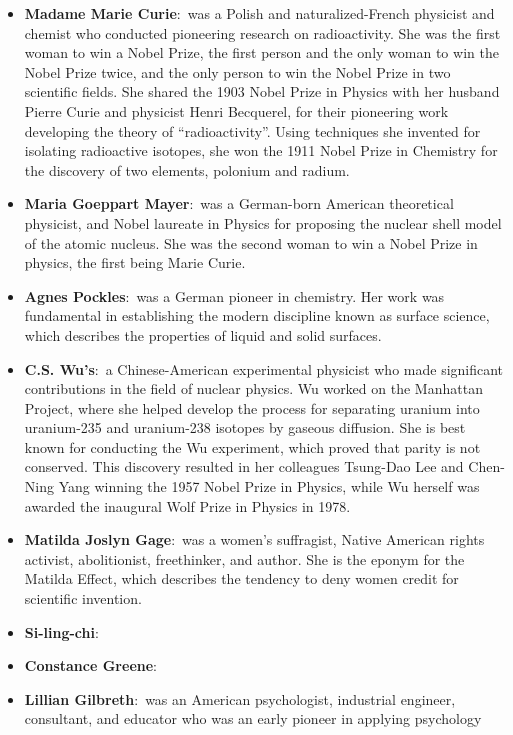 \documentclass[11pt,a4paper]{article}
\begin{document}
  \clearpage
  \begin{itemize}
    \item \textbf{Madame Marie Curie}:\ was a Polish and naturalized-French physicist and chemist who conducted pioneering research on radioactivity. 
    She was the first woman to win a Nobel Prize, the first person and the only woman to win the Nobel Prize twice, and the only person to win the Nobel 
    Prize in two scientific fields. She shared the 1903 Nobel Prize in Physics with her husband Pierre Curie and physicist Henri Becquerel, for their 
    pioneering work developing the theory of ``radioactivity''. Using techniques she invented for isolating radioactive isotopes, she won the 1911 Nobel 
    Prize in Chemistry for the discovery of two elements, polonium and radium.
    \item \textbf{Maria Goeppart Mayer}:\ was a German-born American theoretical physicist, and Nobel laureate in Physics for proposing the nuclear shell 
    model of the atomic nucleus. She was the second woman to win a Nobel Prize in physics, the first being Marie Curie.
    \item \textbf{Agnes Pockles}:\ was a German pioneer in chemistry. Her work was fundamental in establishing the modern discipline known as surface science, 
    which describes the properties of liquid and solid surfaces.
    \item \textbf{C.S. Wu’s}:\ a Chinese-American experimental physicist who made significant contributions in the field of nuclear physics. Wu worked on the 
    Manhattan Project, where she helped develop the process for separating uranium into uranium-235 and uranium-238 isotopes by gaseous diffusion. She is best 
    known for conducting the Wu experiment, which proved that parity is not conserved. This discovery resulted in her colleagues Tsung-Dao Lee and Chen-Ning 
    Yang winning the 1957 Nobel Prize in Physics, while Wu herself was awarded the inaugural Wolf Prize in Physics in 1978.
    \item \textbf{Matilda Joslyn Gage}:\ was a women's suffragist, Native American rights activist, abolitionist, freethinker, and author. She is the eponym 
    for the Matilda Effect, which describes the tendency to deny women credit for scientific invention.
    \item \textbf{Si-ling-chi}:\
    \item \textbf{Constance Greene}:\
    \item \textbf{Lillian Gilbreth}:\ was an American psychologist, industrial engineer, consultant, and educator who was an early pioneer in applying psychology 

\end{itemize}
\end{document}
